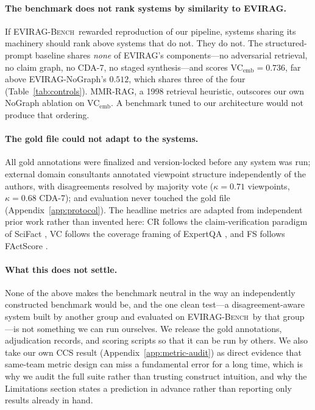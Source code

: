 \documentclass[11pt]{article}
\newcommand{\system}{\textsc{EVIRAG}\xspace}
\newcommand{\bench}{\textsc{EVIRAG-Bench}\xspace}
\begin{document}
\paragraph{The benchmark does not rank systems by similarity to \system.}
If \bench\ rewarded reproduction of our pipeline, systems sharing its machinery
should rank above systems that do not.  They do not.  The structured-prompt
baseline shares \emph{none} of \system's components---no adversarial retrieval,
no claim graph, no CDA-7, no staged synthesis---and scores VC$_\text{emb}{=}0.736$,
far above \system-NoGraph's $0.512$, which shares three of the four
(Table~\ref{tab:controls}).  MMR-RAG, a 1998 retrieval heuristic, outscores our
own NoGraph ablation on VC$_\text{emb}$.  A benchmark tuned to our architecture
would not produce that ordering.

\paragraph{The gold file could not adapt to the systems.}
All gold annotations were finalized and version-locked before any system was
run; external domain consultants annotated viewpoint structure independently of
the authors, with disagreements resolved by majority vote
($\kappa{=}0.71$ viewpoints, $\kappa{=}0.68$ CDA-7); and evaluation never
touched the gold file (Appendix~\ref{app:protocol}).  The headline metrics are
adapted from independent prior work rather than invented here: CR follows the
claim-verification paradigm of SciFact \citep{wadden2020scifact}, VC follows
the coverage framing of ExpertQA \citep{malaviya2024expertqa}, and FS follows
FActScore \citep{min2023factscore}.

\paragraph{What this does not settle.}
None of the above makes the benchmark neutral in the way an independently
constructed benchmark would be, and the one clean test---a disagreement-aware
system built by another group and evaluated on \bench\ by that group---is not
something we can run ourselves.  We release the gold annotations, adjudication
records, and scoring scripts so that it can be run by others.  We also take our
own CCS result (Appendix~\ref{app:metric-audit}) as direct evidence that
same-team metric design can miss a fundamental error for a long time, which is
why we audit the full suite rather than trusting construct intuition, and why the
Limitations section states a prediction in advance rather than reporting only
results already in hand.
\end{document}
